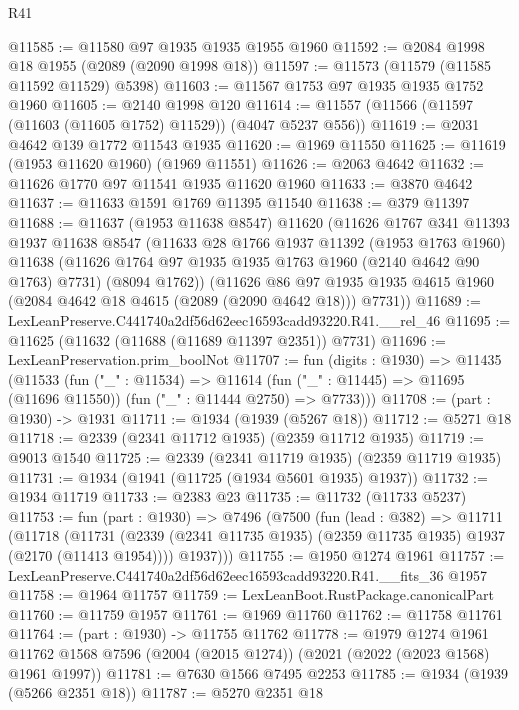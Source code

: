 \begin{lexlean}{R41}
\begin{coremodule}
@11585 := @11580 @97 @1935 @1935 @1955 @1960
@11592 := @2084 @1998 @18 @1955 (@2089 (@2090 @1998 @18))
@11597 := @11573 (@11579 (@11585 @11592 @11529) @5398)
@11603 := @11567 @1753 @97 @1935 @1935 @1752 @1960
@11605 := @2140 @1998 @120
@11614 := @11557 (@11566 (@11597 (@11603 (@11605 @1752) @11529)) (@4047 @5237 @556))
@11619 := @2031 @4642 @139 @1772 @11543 @1935
@11620 := @1969 @11550
@11625 := @11619 (@1953 @11620 @1960) (@1969 @11551)
@11626 := @2063 @4642
@11632 := @11626 @1770 @97 @11541 @1935 @11620 @1960
@11633 := @3870 @4642
@11637 := @11633 @1591 @1769 @11395 @11540
@11638 := @379 @11397
@11688 := @11637
    (@1953 @11638 @8547)
    @11620
    (@11626
      @1767
      @341
      @11393
      @1937
      @11638
      @8547
      (@11633
        @28
        @1766
        @1937
        @11392
        (@1953 @1763 @1960)
        @11638
        (@11626 @1764 @97 @1935 @1935 @1763 @1960 (@2140 @4642 @90 @1763) @7731)
        (@8094 @1762))
      (@11626
        @86
        @97
        @1935
        @1935
        @4615
        @1960
        (@2084 @4642 @18 @4615 (@2089 (@2090 @4642 @18)))
        @7731))
@11689 := LexLeanPreserve.C441740a2df56d62eec16593cadd93220.R41.__rel_46
@11695 := @11625 (@11632 (@11688 (@11689 @11397 @2351)) @7731)
@11696 := LexLeanPreservation.prim_boolNot
@11707 := fun (digits : @1930) =>
  @11435
    (@11533
      (fun ("_" : @11534) =>
      @11614 (fun ("_" : @11445) => @11695 (@11696 @11550)) (fun ("_" : @11444 @2750) => @7733)))
@11708 := (part : @1930) -> @1931
@11711 := @1934 (@1939 (@5267 @18))
@11712 := @5271 @18
@11718 := @2339 (@2341 @11712 @1935) (@2359 @11712 @1935)
@11719 := @9013 @1540
@11725 := @2339 (@2341 @11719 @1935) (@2359 @11719 @1935)
@11731 := @1934 (@1941 (@11725 (@1934 @5601 @1935) @1937))
@11732 := @1934 @11719
@11733 := @2383 @23
@11735 := @11732 (@11733 @5237)
@11753 := fun (part : @1930) =>
  @7496
    (@7500
      (fun (lead : @382) =>
      @11711
        (@11718
          (@11731 (@2339 (@2341 @11735 @1935) (@2359 @11735 @1935) @1937 (@2170 (@11413 @1954))))
          @1937)))
@11755 := @1950 @1274 @1961
@11757 := LexLeanPreserve.C441740a2df56d62eec16593cadd93220.R41.__fits_36 @1957
@11758 := @1964 @11757
@11759 := LexLeanBoot.RustPackage.canonicalPart
@11760 := @11759 @1957
@11761 := @1969 @11760
@11762 := @11758 @11761
@11764 := (part : @1930) -> @11755 @11762
@11778 := @1979
    @1274
    @1961
    @11762
    @1568
    @7596
    (@2004 (@2015 @1274))
    (@2021 (@2022 (@2023 @1568) @1961 @1997))
@11781 := @7630 @1566 @7495 @2253
@11785 := @1934 (@1939 (@5266 @2351 @18))
@11787 := @5270 @2351 @18

\end{coremodule}
\end{lexlean}
